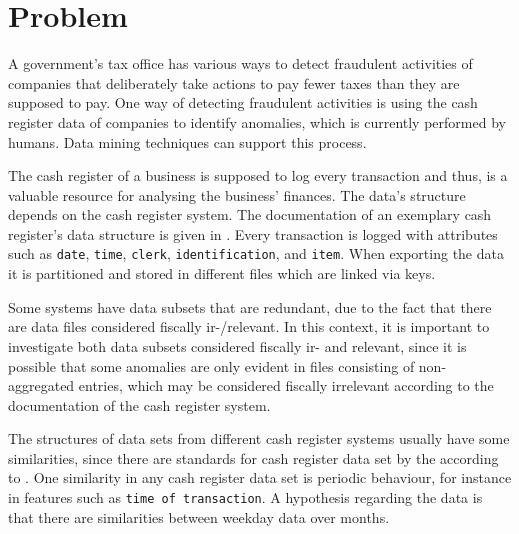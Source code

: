 \section{Problem}
\label{sec:problem}
A government's tax office has various ways to detect fraudulent activities of companies that deliberately take actions to pay fewer taxes than they are supposed to pay. One way of detecting fraudulent activities is using the cash register data of companies to identify anomalies, which is currently performed by humans.
Data mining techniques can support this process.

The cash register of a business is supposed to log every transaction and thus, is a valuable resource for analysing the business' finances.
The data's structure depends on the cash register system. 
The documentation of an exemplary cash register's data structure is given in \cite{Vectron}. Every transaction is logged with attributes such as \texttt{date}, \texttt{time}, \texttt{clerk}, \texttt{identification}, and \texttt{item}. 
When exporting the data it is partitioned and stored in different files which are linked via keys.

Some systems have data subsets that are redundant, due to the fact that there are data files considered fiscally ir-/relevant. In this context, it is important to investigate both data subsets considered fiscally ir- and relevant, since it is possible that some anomalies are only evident in files consisting of non-aggregated entries, which may be considered fiscally irrelevant according to the documentation of the cash register system.

The structures of data sets from different cash register systems usually have some similarities, since there are standards for cash register data set by the  according to \cite{ff_review_techniques}.
One similarity in any cash register data set is periodic behaviour, for instance in features such as \texttt{time of transaction}. A hypothesis regarding the data is that there are similarities between weekday data over months.